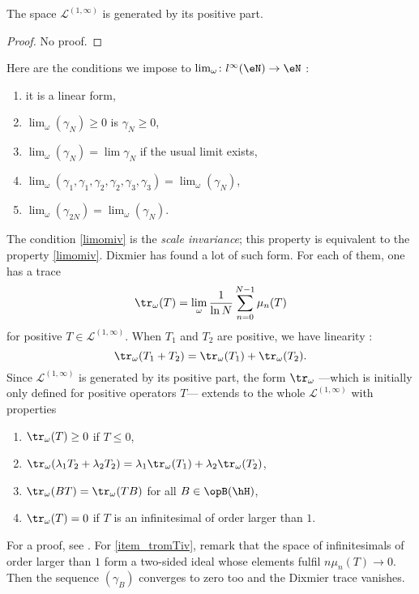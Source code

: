 \begin{proposition}
The space $\mathscr{L}^{(1,\infty)}$ is generated by its positive part.
\end{proposition}
\begin{proof}
No proof.
\end{proof}
Here are the conditions we impose to $\lim_{\omega}\colon l^{\infty}(\eN)\to \eN$ :
\begin{enumerate}
\item it is a linear form,
\item $\lim_{\omega}(\gamma_N)\geq 0$ is $\gamma_N\geq0$,
\item $\lim_{\omega}(\gamma_N)=\lim\gamma_N$ if the usual limit exists,
\item\label{limomiii}$\lim_{\omega}(\gamma_1,\gamma_1,\gamma_2,\gamma_2,\gamma_3,\gamma_3)=\lim_{\omega}(\gamma_N)$,
\item\label{limomiv} $\lim_{\omega}(\gamma_{2N})=\lim_{\omega}(\gamma_N)$.
\end{enumerate}
The condition \ref{limomiv} is the \emph{scale invariance}; this property is equivalent to the property \ref{limomiv}. Dixmier has found a lot of such form. For each of them, one has a trace
\begin{equation}
   \tr_{\omega}(T)=\lim_{\omega}\frac{1}{ \ln N }\sum_{n=0}^{N-1}\mu_n(T) 
\end{equation}
for positive $T\in\mathscr{L}^{(1,\infty)}$. When $T_1$ and $T_2$ are positive, we have linearity :
\[ 
  \tr_{\omega}(T_1+T_2)=\tr_{\omega}(T_1)+\tr_{\omega}(T_2).
\]
Since $\mathscr{L}^{(1,\infty)}$ is generated by its positive part, the form $\tr_{\omega}$ ---which is initially only defined for positive operators $T$--- extends to the whole $\mathscr{L}^{(1,\infty)}$ with properties
\begin{enumerate}
\item $\tr_{\omega}(T)\geq0$ if $T\leq0$,
\item $\tr_{\omega}(\lambda_1T_2+\lambda_2 T_2)=\lambda_1\tr_{\omega}(T_1)+\lambda_2\tr_{\omega}(T_2)$,
\item $\tr_{\omega}(BT)=\tr_{\omega}(TB)$ for all $B\in\opB(\hH)$,
\item\label{item_tromTiv} $\tr_{\omega}(T)=0$ if $T$ is an infinitesimal of order larger than $1$.
\end{enumerate}
For a proof, see \cite{Landi}. For \ref{item_tromTiv}, remark that the space of infinitesimals of order larger than $1$ form a two-sided ideal whose elements fulfil $n\mu_n(T)\to 0$. Then the sequence $(\gamma_B)$ converges to zero too and the Dixmier trace vanishes.



